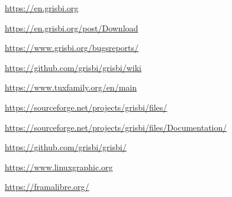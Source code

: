 

\urldef{\urlGrisbi}%
\url{https://en.grisbi.org}

\urldef{\urlGrisbiTelechargement}%
\url{https://en.grisbi.org/post/Download}

\urldef{\urlBugTracker}%
\url{https://www.grisbi.org/bugsreports/}

\urldef{\urlGrisbiWiki}%
\url{https://github.com/grisbi/grisbi/wiki}

\urldef{\urlTuxFamily}%
\url{https://www.tuxfamily.org/en/main}

\urldef{\urlSourceForge}%
\url{https://sourceforge.net/projects/grisbi/files/}

\urldef{\urlSourceForgeDocumentation}%
\url{https://sourceforge.net/projects/grisbi/files/Documentation/}

\urldef{\urlGitHubGrisbi}%
\url{https://github.com/grisbi/grisbi/}

\urldef{\urlLinuxGraphic}%
\url{https://www.linuxgraphic.org}

\urldef{\urlFramasoftLogiciels}%
\url{https://framalibre.org/}








